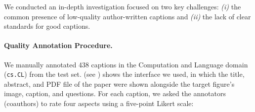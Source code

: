 
We conducted an in-depth investigation focused on two key challenges: {\em (i)} the common presence of low-quality author-written captions and {\em (ii)} the lack of clear standards for good captions.

\paragraph{Quality Annotation Procedure.}
We manually annotated 438 captions in the Computation and Language domain (\texttt{cs.CL}) from the test set. 
 (see ) shows the interface we used, in which the title, abstract, 
and PDF file of the paper were shown alongside the target figure's image, caption, and questions.
For each caption, we asked the annotators (coauthors) to rate four aspects using a five-point Likert scale:




\vspace{-.3pc}

